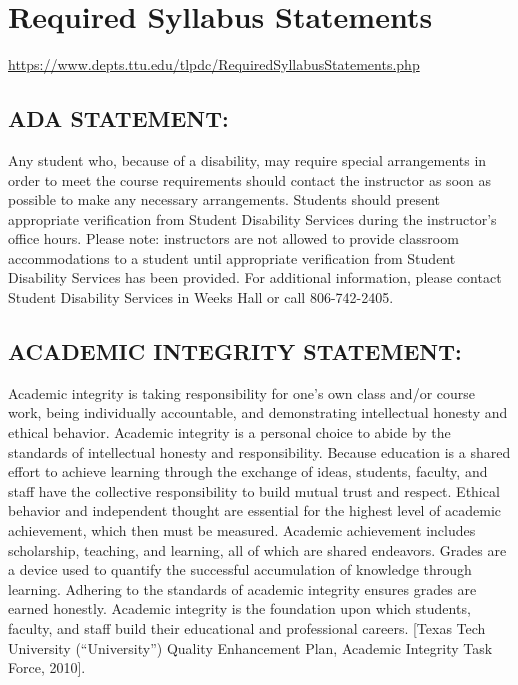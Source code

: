 \documentclass[12pt]{article}
\begin{document}
\clearpage
%

\section*{Required Syllabus Statements}
\url{https://www.depts.ttu.edu/tlpdc/RequiredSyllabusStatements.php}
\subsection*{ADA STATEMENT:}
Any student who, because of a disability, may require special arrangements in order to meet the course requirements should contact the instructor as soon as possible to make any necessary arrangements. Students should present appropriate verification from Student Disability Services during the instructor's office hours. Please note: instructors are not allowed to provide classroom accommodations to a student until appropriate verification from Student Disability Services has been provided. For additional information, please contact Student Disability Services in Weeks Hall or call 806-742-2405.

\subsection*{ACADEMIC INTEGRITY STATEMENT:}
Academic integrity is taking responsibility for one's own class and/or course work, being individually accountable, and demonstrating intellectual honesty and ethical behavior. Academic integrity is a personal choice to abide by the standards of intellectual honesty and responsibility. Because education is a shared effort to achieve learning through the exchange of ideas, students, faculty, and staff have the collective responsibility to build mutual trust and respect. Ethical behavior and independent thought are essential for the highest level of academic achievement, which then must be measured. Academic achievement includes scholarship, teaching, and learning, all of which are shared endeavors. Grades are a device used to quantify the successful accumulation of knowledge through learning. Adhering to the standards of academic integrity ensures grades are earned honestly. Academic integrity is the foundation upon which students, faculty, and staff build their educational and professional careers. [Texas Tech University (“University”) Quality Enhancement Plan, Academic Integrity Task Force, 2010].
\end{document}
